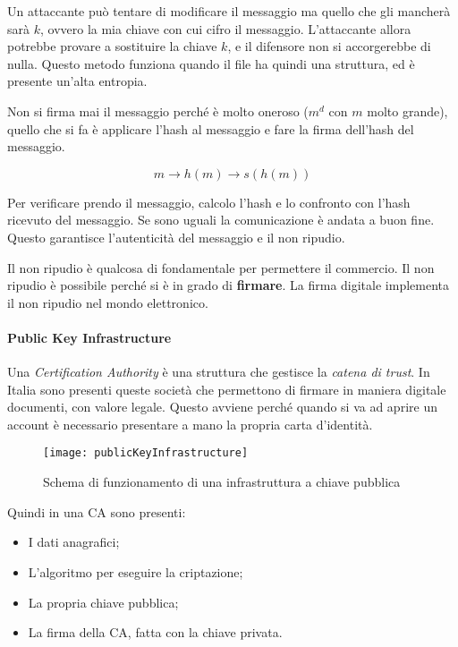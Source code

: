 Un attaccante può tentare di modificare il messaggio ma quello che gli mancherà
sarà $k$, ovvero la mia chiave con cui cifro il messaggio.
L'attaccante allora potrebbe provare a sostituire la chiave $k$, e il difensore
non si accorgerebbe di nulla. Questo metodo funziona quando il file ha quindi
una struttura, ed è presente un'alta entropia.

Non si firma mai il messaggio perché è molto oneroso ($m^d$ con $m$ molto
grande), quello che si fa è applicare l'hash al messaggio e fare la firma
dell'hash del messaggio.

$$
m \rightarrow h(m) \rightarrow s(h(m))
$$

Per verificare prendo il messaggio, calcolo l'hash e lo confronto con l'hash
ricevuto del messaggio. Se sono uguali la comunicazione è andata a buon fine.
Questo garantisce l'autenticità del messaggio e il non ripudio.

Il non ripudio è qualcosa di fondamentale per permettere il commercio. Il non
ripudio è possibile perché si è in grado di \textbf{firmare}. La firma digitale
implementa il non ripudio nel mondo elettronico.

\paragraph{Public Key Infrastructure}

Una \textit{Certification Authority} è una struttura che gestisce la
\textit{catena di trust}. In Italia sono presenti queste società che permettono
di firmare in maniera digitale documenti, con valore legale. Questo avviene
perché quando si va ad aprire un account è necessario presentare a mano la
propria carta d'identità.


\begin{figure}[H]
 \centering
 \texttt{[image: publicKeyInfrastructure]}
 \caption{Schema di funzionamento di una infrastruttura a chiave pubblica}
\end{figure}

Quindi in una CA sono presenti:
\begin{itemize}
\item I dati anagrafici;
\item L'algoritmo per eseguire la criptazione;
\item La propria chiave pubblica;
\item La firma della CA, fatta con la chiave privata.
\end{itemize}

